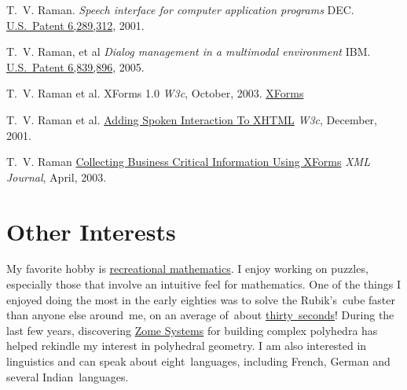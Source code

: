 \documentclass{article}
\begin{document}
\begin{compactitem}{}
\item   T.~V. Raman.  
  \emph{Speech interface for computer application programs}
 DEC.\@
  \href{https://www.google.com/patents/US6289312}
  {U.S.\ Patent 6,289,312},  2001.
\item   T.~V. Raman,  et al 
  \emph{Dialog management  in a multimodal environment}
 IBM.  \@
  \href{https://www.google.com/patents/US6839896}
  {U.S.\ Patent 6,839,896},  2005.
\item   T.~V.  Raman et al.  
 XForms 1.0 
 \emph{W3c}, October, 2003.  
  \href{http://www.w3.org/tr/xforms}{XForms}
\item   T.~V.  Raman et al.  
  \href{http://www.w3.org/tr/xml-events}{Adding Spoken Interaction To XHTML} 
 \emph{W3c}, December, 2001.  
\item   T.~V.  Raman 
 \href{http://www.sys-con.com/xml/article.cfm?id=578}%
{Collecting Business Critical Information Using XForms} 
  \emph{XML Journal}, April, 2003.
\end{compactitem}
\section*{Other Interests}
My favorite hobby is
\href{http://www.cs.cornell.edu/home/raman/publications/polyhedra}%
{recreational mathematics}.  I enjoy working on puzzles,
especially those that involve an intuitive feel for mathematics.
One of the things I enjoyed doing the most in the early eighties
was to solve the Rubik's~cube faster than anyone else around~me,
on an average of~about 
\href{http://www.youtube.com/watch?v=vSSLj3KvkbI}{thirty~seconds}!  During the last few
years, discovering
\href{http://emacspeak.sf.net/raman/publications/polyhedra/}{Zome
  Systems} for building complex polyhedra has helped rekindle my
interest in polyhedral geometry.  I am also interested in
linguistics and can speak about eight~languages, including
French, German and several Indian~languages.
\end{document}

